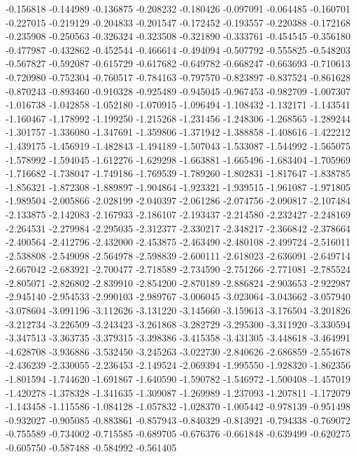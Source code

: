 -0.156818
-0.144989
-0.136875
-0.208232
-0.180426
-0.097091
-0.064485
-0.160701
-0.227015
-0.219129
-0.204833
-0.201547
-0.172452
-0.193557
-0.220388
-0.172168
-0.235908
-0.250563
-0.326324
-0.323508
-0.321890
-0.333761
-0.454545
-0.356180
-0.477987
-0.432862
-0.452544
-0.466614
-0.494094
-0.507792
-0.555825
-0.548203
-0.567827
-0.592087
-0.615729
-0.617682
-0.649782
-0.668247
-0.663693
-0.710613
-0.720980
-0.752304
-0.760517
-0.784163
-0.797570
-0.823897
-0.837524
-0.861628
-0.870243
-0.893460
-0.910328
-0.925489
-0.945045
-0.967453
-0.982709
-1.007307
-1.016738
-1.042858
-1.052180
-1.070915
-1.096494
-1.108432
-1.132171
-1.143541
-1.160467
-1.178992
-1.199250
-1.215268
-1.231456
-1.248306
-1.268565
-1.289244
-1.301757
-1.336080
-1.347691
-1.359806
-1.371942
-1.388858
-1.408616
-1.422212
-1.439175
-1.456919
-1.482843
-1.494189
-1.507043
-1.533087
-1.544992
-1.565075
-1.578992
-1.594045
-1.612276
-1.629298
-1.663881
-1.665496
-1.683404
-1.705969
-1.716682
-1.738047
-1.749186
-1.769539
-1.789260
-1.802831
-1.817647
-1.838785
-1.856321
-1.872308
-1.889897
-1.904864
-1.923321
-1.939515
-1.961087
-1.971805
-1.989504
-2.005866
-2.028199
-2.040397
-2.061286
-2.074756
-2.090817
-2.107484
-2.133875
-2.142083
-2.167933
-2.186107
-2.193437
-2.214580
-2.232427
-2.248169
-2.264531
-2.279984
-2.295035
-2.312377
-2.330217
-2.348217
-2.366842
-2.378664
-2.400564
-2.412796
-2.432000
-2.453875
-2.463490
-2.480108
-2.499724
-2.516011
-2.538808
-2.549098
-2.564978
-2.598839
-2.600111
-2.618023
-2.636091
-2.649714
-2.667042
-2.683921
-2.700477
-2.718589
-2.734590
-2.751266
-2.771081
-2.785524
-2.805071
-2.826802
-2.839910
-2.854200
-2.870189
-2.886824
-2.903653
-2.922987
-2.945140
-2.954533
-2.990103
-2.989767
-3.006045
-3.023064
-3.043662
-3.057940
-3.078604
-3.091196
-3.112626
-3.131220
-3.145660
-3.159613
-3.176504
-3.201826
-3.212734
-3.226509
-3.243423
-3.261868
-3.282729
-3.295300
-3.311920
-3.330594
-3.347513
-3.363735
-3.379315
-3.398386
-3.415358
-3.431305
-3.448618
-3.464991
-4.628708
-3.936886
-3.532450
-3.245263
-3.022730
-2.840626
-2.686859
-2.554678
-2.436239
-2.330055
-2.236453
-2.149524
-2.069394
-1.995550
-1.928320
-1.862356
-1.801594
-1.744620
-1.691867
-1.640590
-1.590782
-1.546972
-1.500408
-1.457019
-1.420278
-1.378328
-1.341635
-1.309087
-1.269989
-1.237093
-1.207811
-1.172079
-1.143458
-1.115586
-1.084128
-1.057832
-1.028370
-1.005442
-0.978139
-0.951498
-0.932027
-0.905085
-0.883861
-0.857943
-0.840329
-0.813921
-0.794338
-0.769072
-0.755589
-0.734002
-0.715585
-0.689705
-0.676376
-0.661848
-0.639499
-0.620275
-0.605750
-0.587488
-0.584992
-0.561405
